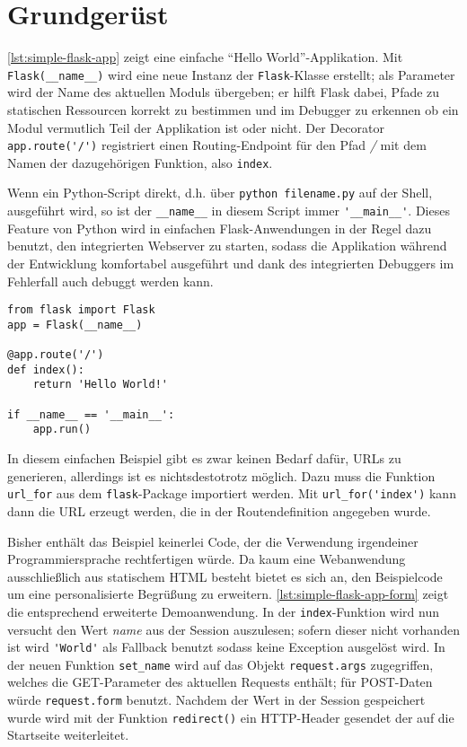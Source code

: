 \section{Grundgerüst}

\autoref{lst:simple-flask-app} zeigt eine einfache \enquote{Hello World}-Applikation. Mit
\lstinline{Flask(__name__)} wird eine neue Instanz der \lstinline{Flask}-Klasse erstellt; als
Parameter wird der Name des aktuellen Moduls übergeben; er hilft Flask dabei, Pfade zu statischen
Ressourcen korrekt zu bestimmen und im Debugger zu erkennen ob ein Modul vermutlich Teil der
Applikation ist oder nicht. Der Decorator \lstinline{app.route('/')} registriert einen
Routing-Endpoint für den Pfad \emph{/} mit dem Namen der dazugehörigen Funktion, also
\lstinline{index}.

Wenn ein Python-Script direkt, d.h. über \lstinline{python filename.py} auf der Shell, ausgeführt
wird, so ist der \lstinline{__name__} in diesem Script immer \lstinline{'__main__'}. Dieses Feature
von Python wird in einfachen Flask-Anwendungen in der Regel dazu benutzt, den integrierten Webserver
zu starten, sodass die Applikation während der Entwicklung komfortabel ausgeführt und dank des
integrierten Debuggers im Fehlerfall auch debuggt werden kann.

\begin{lstlisting}[caption=Hello World mit Flask,label=lst:simple-flask-app]
from flask import Flask
app = Flask(__name__)

@app.route('/')
def index():
    return 'Hello World!'

if __name__ == '__main__':
    app.run()
\end{lstlisting}

In diesem einfachen Beispiel gibt es zwar keinen Bedarf dafür, URLs zu generieren, allerdings ist es
nichtsdestotrotz möglich. Dazu muss die Funktion \lstinline{url_for} aus dem
\lstinline{flask}-Package importiert werden. Mit \lstinline{url_for('index')} kann dann die URL
erzeugt werden, die in der Routendefinition angegeben wurde.

Bisher enthält das Beispiel keinerlei Code, der die Verwendung irgendeiner Programmiersprache
rechtfertigen würde. Da kaum eine Webanwendung ausschließlich aus statischem HTML besteht bietet es
sich an, den Beispielcode um eine personalisierte Begrüßung zu erweitern.
\autoref{lst:simple-flask-app-form} zeigt die entsprechend erweiterte Demoanwendung. In der
\lstinline{index}-Funktion wird nun versucht den Wert \emph{name} aus der Session auszulesen; sofern
dieser nicht vorhanden ist wird \lstinline{'World'} als Fallback benutzt sodass keine Exception
ausgelöst wird. In der neuen Funktion \lstinline{set_name} wird auf das Objekt
\lstinline{request.args} zugegriffen, welches die GET-Parameter des aktuellen Requests enthält; für
POST-Daten würde \lstinline{request.form} benutzt. Nachdem der Wert in der Session gespeichert wurde
wird mit der Funktion \lstinline{redirect()} ein HTTP-Header gesendet der auf die Startseite
weiterleitet.


